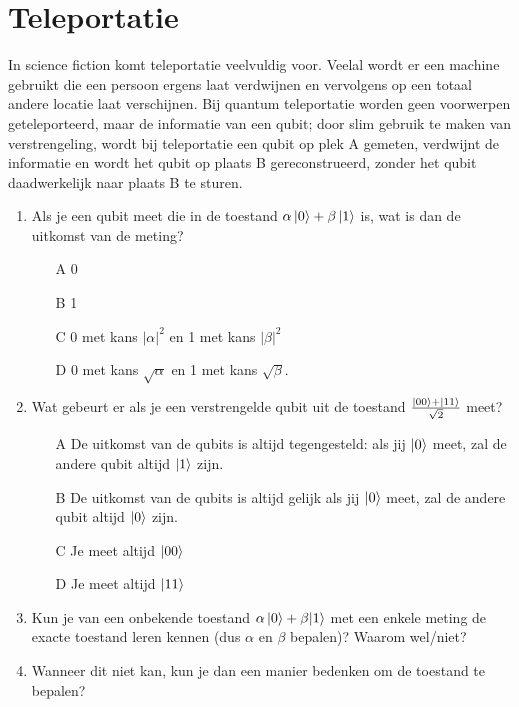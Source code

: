 \documentclass[../../main.tex]{subfiles}
\begin{document}
\onlyinsubfile{
\setcounter{chapter}{0}
}
\notinsubfile{}
\section{Teleportatie}\label{sec:teleportatie}

In science fiction komt teleportatie veelvuldig voor. Veelal wordt er een machine gebruikt die een persoon ergens laat verdwijnen en vervolgens op een totaal andere locatie laat verschijnen. Bij quantum teleportatie worden geen voorwerpen geteleporteerd, maar de informatie van een qubit; door slim gebruik te maken van verstrengeling, wordt bij teleportatie een qubit op plek A gemeten, verdwijnt de informatie en wordt het qubit op plaats B gereconstrueerd, zonder het qubit daadwerkelijk naar plaats B te sturen.
\begin{enumerate}
\item Als je een qubit meet die in de toestand $\alpha\ket{0}+\beta\ket{1}$ is, wat is dan de uitkomst van de meting?
\begin{itemize}
\item[A] 0
\item[B] 1
\item[C] 0 met kans $|\alpha|^2$ en 1 met kans $|\beta|^2$ 
\item[D] 0 met kans $\sqrt{\alpha}$ en 1 met kans $\sqrt{\beta}$.
\end{itemize}
\item Wat gebeurt er als je een verstrengelde qubit uit de toestand  $\frac{\ket{00}+\ket{11}}{\sqrt{2}}$ meet?
\begin{itemize}
\item[A] De uitkomst van de qubits is altijd tegengesteld: als jij $\ket{0}$ meet, zal de andere qubit altijd $\ket{1}$ zijn.
\item[B] De uitkomst van de qubits is altijd gelijk als jij $\ket{0}$ meet, zal de andere qubit altijd $\ket{0}$ zijn.
\item[C] Je meet altijd $\ket{00}$
\item[D] Je meet altijd $\ket{11}$
\end{itemize}
\item Kun je van een onbekende toestand $\alpha\ket{0}+\beta{\ket{1}}$ met een enkele meting de exacte toestand leren kennen (dus $\alpha$ en $\beta$ bepalen)? Waarom wel/niet?
\item Wanneer dit niet kan, kun je dan een manier bedenken om de toestand te bepalen?
\end{enumerate}
\end{document}
